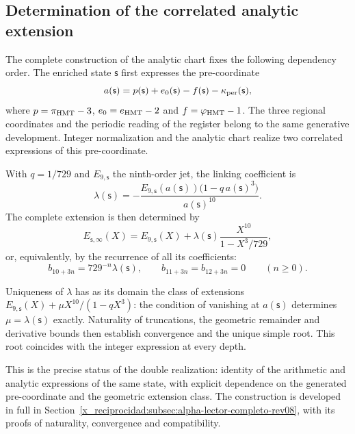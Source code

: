 \subsection*{Determination of the correlated analytic extension}

The complete construction of the analytic chart fixes the following dependency order. The enriched state $\mathsf s$ first expresses the pre-coordinate
\[
 a(\mathsf s)=p(\mathsf s)+e_0(\mathsf s)-f(\mathsf s)
              -\kappa_{\rm per}(\mathsf s),
\]
where $p=\pi_{\rm HMT}-3$, $e_0=e_{\rm HMT}-2$ and $f=\varphi_{\rm HMT}-1$. The three regional coordinates and the periodic reading of the register belong to the same generative development. Integer normalization and the analytic chart realize two correlated expressions of this pre-coordinate.

With $q=1/729$ and $E_{9,\mathsf s}$ the ninth-order jet, the linking coefficient is
\[
 \lambda(\mathsf s)=
 -\frac{E_{9,\mathsf s}(a(\mathsf s))
         \bigl(1-q\,a(\mathsf s)^3\bigr)}{a(\mathsf s)^{10}}.
\]
The complete extension is then determined by
\[
 E_{\mathsf s,\infty}(X)=E_{9,\mathsf s}(X)
      +\lambda(\mathsf s)\frac{X^{10}}{1-X^3/729},
\]
or, equivalently, by the recurrence of all its coefficients:
\[
 b_{10+3n}=729^{-n}\lambda(\mathsf s),\qquad
 b_{11+3n}=b_{12+3n}=0\qquad(n\geq0).
\]

Uniqueness of $\lambda$ has as its domain the class of extensions $E_{9,\mathsf s}(X)+\mu X^{10}/(1-qX^3)$: the condition of vanishing at $a(\mathsf s)$ determines $\mu=\lambda(\mathsf s)$ exactly. Naturality of truncations, the geometric remainder and derivative bounds then establish convergence and the unique simple root. This root coincides with the integer expression at every depth.

This is the precise status of the double realization: identity of the arithmetic and analytic expressions of the same state, with explicit dependence on the generated pre-coordinate and the geometric extension class. The construction is developed in full in Section~\ref{x_reciprocidad:subsec:alpha-lector-completo-rev08}, with its proofs of naturality, convergence and compatibility.
